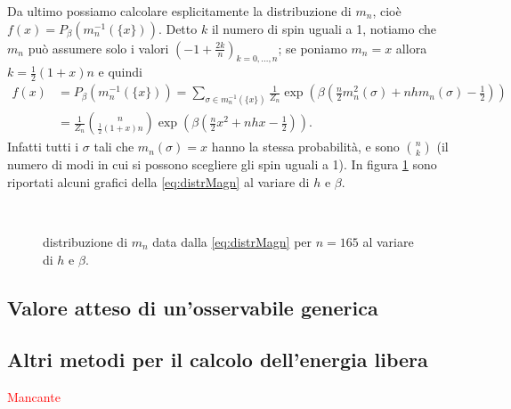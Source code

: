Da ultimo possiamo calcolare esplicitamente la distribuzione di $ m_n $, cioè $ f(x) = P_\beta \left( m_n^{-1} (\{x\}) \right) $. Detto $ k $ il numero di spin uguali a 1, notiamo che $ m_n $ può assumere solo i valori $ \left(-1 + \frac{2k}{n}\right)_{k=0,\ldots,n} $; se poniamo $ m_n = x $ allora $ k = \frac{1}{2}(1+x) n $ e quindi
\begin{align}\label{eq:distrMagn}
    f(x) & = P_\beta \left( m_n^{-1} (\{x\}) \right) = \sum_{\sigma\in m_n^{-1}(\{x\})} \frac{1}{Z_n} \exp\left( \beta\left( \frac{n}{2}m_n^2(\sigma) + nhm_n(\sigma) -\frac{1}{2}\right) \right) \nonumber \\
    & = \frac{1}{Z_n} \binom{n}{\frac{1}{2}(1+x) n} \exp\left( \beta\left( \frac{n}{2}x^2 + nhx - \frac{1}{2} \right) \right).
\end{align}
Infatti tutti i $ \sigma $ tali che $ m_n(\sigma) = x $ hanno la stessa probabilità, e sono $ \binom{n}{k} $ (il numero di modi in cui si possono scegliere gli spin uguali a 1). In figura \ref{fig:distrMagn} sono riportati alcuni grafici della \eqref{eq:distrMagn} al variare di $ h $ e $ \beta $.

\iffigureon
\begin{figure}[p]
    \centering
    \subfloat[$ h=0, \beta=1 $.]{}
    \subfloat[$ h=0, \beta<1 $.]{} \\
    \subfloat[$ h=0, \beta>1 $: si ha magnetizzazione spontanea.]{}
    \caption{distribuzione di $ m_n $ data dalla \eqref{eq:distrMagn} per $ n = 165 $ al variare di $ h $ e $ \beta $.}
    \label{fig:distrMagn}
\end{figure}
\fi

\subsection{Valore atteso di un'osservabile generica}


\subsection{Altri metodi per il calcolo dell'energia libera}
\textcolor{red}{Mancante}